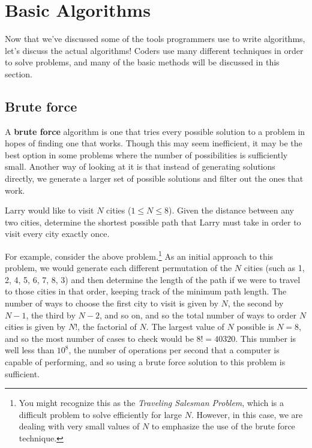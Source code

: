 \chapter{Basic Algorithms}

Now that we've discussed some of the tools programmers use to write algorithms, let's discuss the actual algorithms!  Coders use many different techniques in order to solve problems, and many of the basic methods will be discussed in this section.

\section{Brute force}

A \textbf{brute force} algorithm is one that tries every possible solution to a problem in hopes of finding one that works. Though this may seem inefficient, it may be the best option in some problems where the number of possibilities is sufficiently small. Another way of looking at it is that instead of generating solutions directly, we generate a larger set of possible solutions and filter out the ones that work.

\begin{Problem}
Larry would like to visit $ N $ cities ($1 \leq N \leq 8$).  Given the distance between any two cities, determine the shortest possible path that Larry must take in order to visit every city exactly once.
\end{Problem}

For example, consider the above problem.\footnote{You might recognize this as the \textit{Traveling Salesman Problem}, which is a difficult problem to solve efficiently for large $ N $.  However, in this case, we are dealing with very small values of $ N $ to emphasize the use of the brute force technique.} As an initial approach to this problem, we would generate each different permutation of the $ N $ cities (such as 1, 2, 4, 5, 6, 7, 8, 3) and then determine the length of the path if we were to travel to those cities in that order, keeping track of the minimum path length.  The number of ways to choose the first city to visit is given by $ N $, the second by $ N - 1 $, the third by $ N - 2 $, and so on, and so the total number of ways to order $ N $ cities is given by $ N! $, the factorial of $ N $.  The largest value of $ N $ possible is $ N = 8 $, and so the most number of cases to check would be $ 8! = 40320 $.  This number is well less than $ 10^8 $, the number of operations per second that a computer is capable of performing, and so using a brute force solution to this problem is sufficient.

